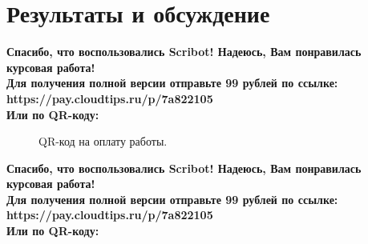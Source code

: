 \documentclass{article}
\begin{document}
\section{Результаты и обсуждение}
\begin{center}
    \textbf{
        Спасибо, что воспользовались Scribot! Надеюсь, Вам понравилась курсовая работа!\\
        Для получения полной версии отправьте 99 рублей по ссылке:\\
        https://pay.cloudtips.ru/p/7a822105\\
        Или по QR-коду:\\
    }
\end{center}
\begin{figure}[h]
    \caption{QR-код на оплату работы.}
    \label{ris:image}
\end{figure}
\newpage
\begin{center}
    \textbf{
        Спасибо, что воспользовались Scribot! Надеюсь, Вам понравилась курсовая работа!\\
        Для получения полной версии отправьте 99 рублей по ссылке:\\
        https://pay.cloudtips.ru/p/7a822105\\
        Или по QR-коду:\\
    }
\end{center}
\end{document}
